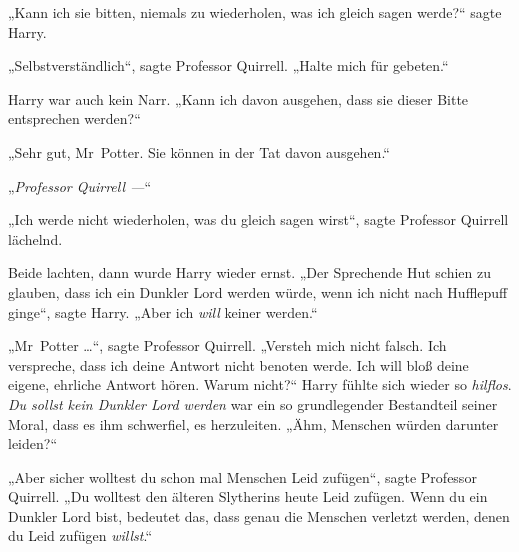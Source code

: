 „Kann ich sie bitten, niemals zu wiederholen, was ich gleich sagen werde?“ sagte Harry.

„Selbstverständlich“, sagte Professor Quirrell.
„Halte mich für gebeten.“

Harry war auch kein Narr.
„Kann ich davon ausgehen, dass sie dieser Bitte entsprechen werden?“

„Sehr gut, Mr~Potter. Sie können in der Tat davon ausgehen.“

„\emph{Professor Quirrell —}“

„Ich werde nicht wiederholen, was du gleich sagen wirst“, sagte Professor Quirrell lächelnd.

Beide lachten, dann wurde Harry wieder ernst.
„Der Sprechende Hut schien zu glauben, dass ich ein Dunkler Lord werden würde, wenn ich nicht nach Hufflepuff ginge“, sagte Harry.
„Aber ich \emph{will} keiner werden.“

„Mr~Potter …“, sagte Professor Quirrell.
„Versteh mich nicht falsch. Ich verspreche, dass ich deine Antwort nicht benoten werde. Ich will bloß deine eigene, ehrliche Antwort hören. Warum nicht?“
Harry fühlte sich wieder so \emph{hilflos}. \emph{Du sollst kein Dunkler Lord werden} war ein so grundlegender Bestandteil seiner Moral, dass es ihm schwerfiel, es herzuleiten. „Ähm, Menschen würden darunter leiden?“

„Aber sicher wolltest du schon mal Menschen Leid zufügen“, sagte Professor Quirrell.
„Du wolltest den älteren Slytherins heute Leid zufügen. Wenn du ein Dunkler Lord bist, bedeutet das, dass genau die Menschen verletzt werden, denen du Leid zufügen \emph{willst}.“

